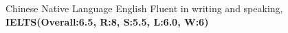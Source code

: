 \begin{cvhonors}
  \cvhonor
    {Chinese}
    {Native Language}
    {}
    {}
  \cvhonor
    {English}
    {Fluent in writing and speaking, \textbf{IELTS(Overall:6.5, R:8, S:5.5, L:6.0, W:6)}}
    {}
    {}
\end{cvhonors}
